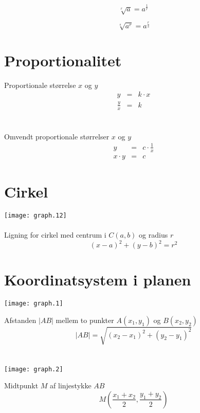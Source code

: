 \documentclass[11pt,a5paper,fleqn,leqno]{book}
\begin{document}
\begin{equation}
\sqrt[r]{a} = a^{\frac{1}{r}}
\end{equation}

\begin{equation}
\sqrt[s]{a^{r}} = a^{\frac{r}{s}}
\end{equation}

\vfill

\section{Proportionalitet}

Proportionale størrelse $x$ og $y$
\begin{eqnarray}
y & =&  k \cdot x \\
\frac{y}{x} & = & k \nonumber
\end{eqnarray}
\\
\\
Omvendt proportionale størrelser $x$ og $y$
\begin{eqnarray}
y & = & c \cdot \frac{1}{x} \\
x \cdot y & = & c \nonumber
\end{eqnarray}

\section{Cirkel}

\texttt{[image: graph.12]}
\\
\\
Ligning for cirkel med centrum i $C(a,b)$ og radius $r$
\begin{equation}
(x-a)^2 + (y-b)^2 = r^2
\end{equation}

\newpage

\section{Koordinatsystem i planen}

\texttt{[image: graph.1]}

Afstanden $|AB|$ mellem to punkter $A(x_1,y_1)$ og $B(x_2,y_2)$
\begin{equation}
|AB| = \sqrt{(x_2-x_1)^2 + (y_2-y_1)^2}
\end{equation}
\\
\\
\texttt{[image: graph.2]}

Midtpunkt $M$ af linjestykke $AB$
\begin{equation}
M\left(\frac{x_1+x_2}{2},\frac{y_1+y_2}{2}\right)
\end{equation}
\end{document}
